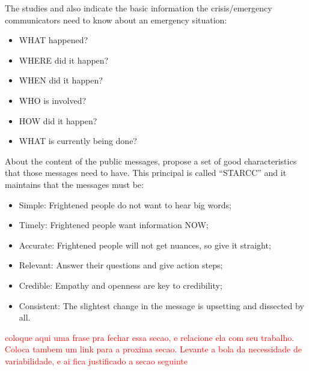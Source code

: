 The studies \citep{cdc2014} and \citep{cisvGuide} also indicate the basic information the crisis/emergency communicators need to know about an emergency situation:
 
 \begin{itemize}
   \item WHAT happened?
   \item WHERE did it happen?
   \item WHEN did it happen?
   \item WHO is involved?
   \item HOW did it happen?
   \item WHAT is currently being done?
      
 \end{itemize}
 
 About the content of the public messages, \cite{reynolds2007crisis} propose a set of good characteristics that those messages need to have. This principal is called ``STARCC'' and it maintains that the messages must be:
 
 \begin{itemize}
   \item Simple: Frightened people do not want to hear big words;
   \item Timely: Frightened people want information NOW;
   \item Accurate: Frightened people will not get nuances, so give it straight;
   \item Relevant: Answer their questions and give action steps;
   \item Credible: Empathy and openness are key to credibility;
   \item Consistent: The slightest change in the message is upsetting and dissected by all.
      
 \end{itemize}

\textcolor{red}{coloque aqui uma frase pra fechar essa secao, e relacione ela com seu trabalho. Coloca tambem um link para a proxima secao. Levante a bola da necessidade de variabilidade, e ai fica justificado a secao seguinte}



